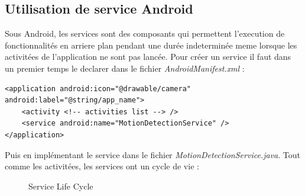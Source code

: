 \subsection{Utilisation de service Android}
Sous Android, les services sont des composants qui permettent l'execution de
fonctionnalités en arriere plan pendant une durée indeterminée meme lorsque les
activitées de l'application ne sont pas lancée.
Pour créer un service il faut dans un premier temps le declarer dans le fichier
\textit{AndroidManifest.xml} :\newline
\begin{lstlisting}
<application android:icon="@drawable/camera" android:label="@string/app_name">
	<activity <!-- activities list --> />
	<service android:name="MotionDetectionService" />
</application>
\end{lstlisting}
Puis en implémentant le service dans le fichier
\textit{MotionDetectionService.java}.
 Tout comme les activitées, les services ont
un cycle de vie :
\newpage
\begin{center}
\begin{figure}
   \label{serviceLifecycle}
  \centering
   \caption{Service Life Cycle \protect\footnotemark}
  \end{figure}
  \end{center}
\newpage


